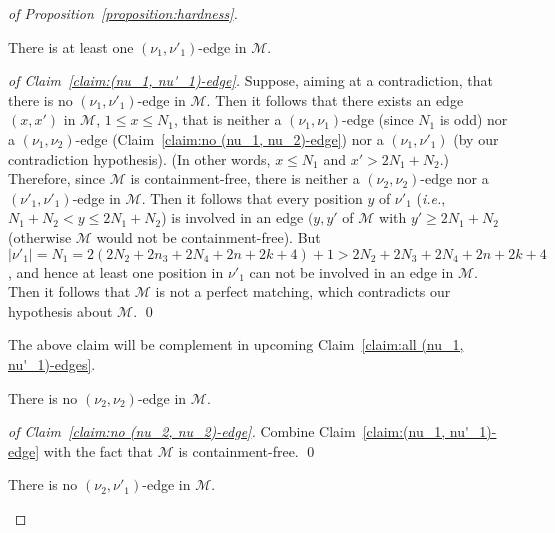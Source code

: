 \documentclass[a4paper]{llncs}
\begin{document}
\begin{proof}[of Proposition~\ref{proposition:hardness}]
  \begin{claim}
    \label{claim:(nu_1, nu'_1)-edge}
    There is at least one $(\nu_1, \nu'_1)$-edge in $\mathcal{M}$.
  \end{claim}

  \begin{proof}[of Claim~\ref{claim:(nu_1, nu'_1)-edge}]
    Suppose, aiming at a contradiction, that there is no
    $(\nu_1, \nu'_1)$-edge in $\mathcal{M}$.
    Then it follows that there exists an edge $(x, x')$ in $\mathcal{M}$,
    $1 \leq x \leq N_1$, that is neither a
    $(\nu_1, \nu_1)$-edge (since $N_1$ is odd)
    nor a $(\nu_1, \nu_2)$-edge (Claim~\ref{claim:no (nu_1, nu_2)-edge})
    nor a $(\nu_1, \nu'_1)$ (by our contradiction hypothesis).
    (In other words, $x \leq N_1$ and $x' > 2N_1 + N_2$.)
    Therefore, since $\mathcal{M}$ is containment-free,
    there is neither a $(\nu_2, \nu_2)$-edge nor a $(\nu'_1, \nu'_1)$-edge
    in $\mathcal{M}$.
    Then it follows that every position $y$ of $\nu'_1$
    (\emph{i.e.}, $N_1+N_2 < y \leq 2N_1+N_2$)
    is involved in an edge $(y, y'$ of $\mathcal{M}$ with $y' \geq 2N_1+N_2$
    (otherwise $\mathcal{M}$ would not be containment-free).
    But $|\nu'_1| = N_1 = 2(2N_2 + 2n_3 + 2N_4 + 2n + 2k + 4) + 1
    > 2N_2 + 2N_3 + 2N_4 + 2n + 2k + 4$, and hence at least one
    position in $\nu'_1$ can not be involved in an edge in $\mathcal{M}$.
    Then it follows that $\mathcal{M}$ is not a perfect matching,
    which contradicts our hypothesis about $\mathcal{M}$.
    \qed
  \end{proof}

  The above claim will be complement in upcoming Claim~\ref{claim:all (nu_1, nu'_1)-edges}.

  \begin{claim}
    \label{claim:no (nu_2, nu_2)-edge}
    There is no $(\nu_2, \nu_2)$-edge in $\mathcal{M}$.
  \end{claim}

  \begin{proof}[of Claim~\ref{claim:no (nu_2, nu_2)-edge}]
  Combine Claim~\ref{claim:(nu_1, nu'_1)-edge} with
  the fact that $\mathcal{M}$ is containment-free.
  \qed
  \end{proof}

  \begin{claim}
    \label{claim:no (nu_2, nu'_1)-edge}
    There is no $(\nu_2, \nu'_1)$-edge in $\mathcal{M}$.
  \end{claim}


\end{proof}
\end{document}
